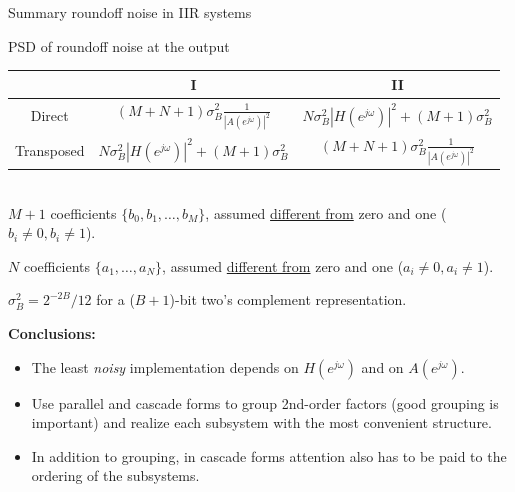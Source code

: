 \documentclass[10pt]{beamer}
\begin{document}
\begin{frame}{Summary roundoff noise in IIR systems}

PSD of roundoff noise at the output
~\\

\begin{tabular}{c||c|c}
	  & I & II \\
	\hline
	Direct & $\displaystyle(M+N+1)\sigma_B^2\frac{1}{|A(e^{j\omega})|^2}$ & $\displaystyle N\sigma_{B}^2|H(e^{j\omega})|^2 + (M+1)\sigma_{B}^2$ \\
	Transposed & $\displaystyle N\sigma_B^2|H(e^{j\omega})|^2 + (M+1)\sigma_B^2$ & $\displaystyle (M+N+1)\sigma_B^2\frac{1}{|A(e^{j\omega})|^2}$ \\
	\hline
\end{tabular}
~\\

$M+1$ coefficients $\{b_0, b_1, \ldots, b_M\}$, assumed \underline{different from} zero and one ($b_i \neq 0, b_i \neq 1$).

$N$ coefficients $\{a_1, \ldots, a_N\}$,  assumed \underline{different from} zero and one ($a_i \neq 0, a_i \neq 1$).

$\sigma_B^2 = 2^{-2B}/12$ for a ($B+1$)-bit two's complement representation.

\vspace{0.5cm}
\textbf{Conclusions:}
\begin{itemize}
	\item The least \textit{noisy} implementation depends on $H(e^{j\omega})$ and on $A(e^{j\omega})$.
	\item Use parallel and cascade forms to group 2nd-order factors (good grouping is important) and realize each subsystem with the most convenient structure.
	\item In addition to grouping, in cascade forms attention also has to be paid to the ordering of the subsystems.
\end{itemize}
\end{frame}
\end{document}
